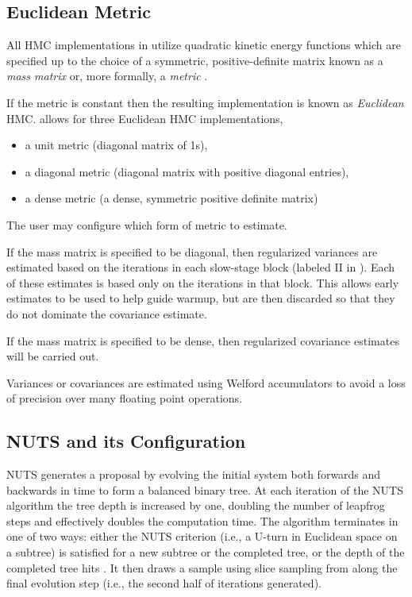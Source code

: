 \subsection{Euclidean Metric}

All HMC implementations in \Stan utilize quadratic kinetic energy
functions which are specified up to the choice of a symmetric,
positive-definite matrix known as a \textit{mass matrix} or, more
formally, a \textit{metric} \citep{Betancourt-Stein:2011}.

If the metric is constant then the resulting implementation is known
as \textit{Euclidean} HMC.  \Stan allows for three Euclidean HMC
implementations,
%
\begin{itemize}
\item a unit metric (diagonal matrix of 1s),
\item a diagonal metric (diagonal matrix with positive diagonal
  entries),
\item a dense metric (a dense, symmetric positive definite matrix)
\end{itemize}
%
The user may configure which form of metric to estimate.  

If the mass matrix is specified to be diagonal, then regularized
variances are estimated based on the iterations in each slow-stage
block (labeled II in ).  Each of these estimates
is based only on the iterations in that block.  This allows early
estimates to be used to help guide warmup, but are then discarded so
that they do not dominate the covariance estimate.  

If the mass matrix is specified to be dense, then regularized
covariance estimates will be carried out.

Variances or covariances are estimated using Welford accumulators
to avoid a loss of precision over many floating point operations.


\subsection{NUTS and its Configuration}

NUTS generates a proposal by evolving the initial system both forwards
and backwards in time to form a balanced binary tree. At each
iteration of the NUTS algorithm the tree depth is increased by one,
doubling the number of leapfrog steps and effectively doubles the
computation time. The algorithm terminates in one of two ways: either
the NUTS criterion (i.e., a U-turn in Euclidean space on a subtree) is
satisfied for a new subtree or the completed tree, or the depth of the
completed tree hits . It then draws a sample using
slice sampling from along the final evolution step (i.e., the second
half of iterations generated).

